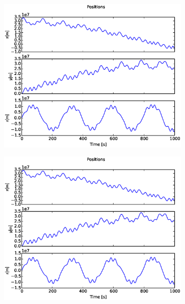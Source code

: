 \documentclass[x11names]{article}
\begin{document}
    \begin{figure}
      \begin{subfigure}{0.45\textwidth}
        \includegraphics[width = \textwidth]{../source/figures/ion_8_5_Eulerxyz}
      \end{subfigure}
      \begin{subfigure}{0.45\textwidth}
        \includegraphics[width = \textwidth]{../source/figures/ion_8_5_Verletxyz}
      \end{subfigure}
      \begin{subfigure}{0.45\textwidth}

\end{subfigure}
\end{figure}
\end{document}
